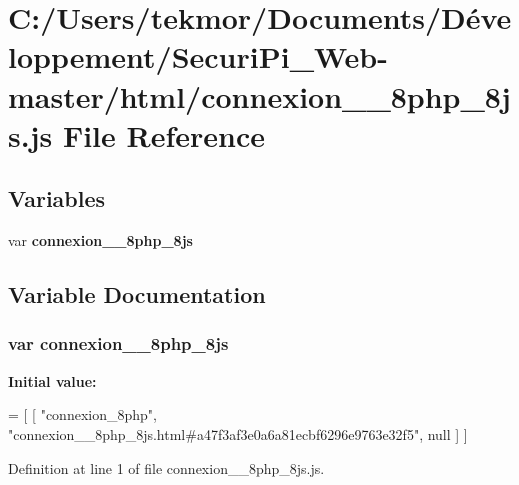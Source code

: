 \section{C\+:/\+Users/tekmor/\+Documents/\+Développement/\+Securi\+Pi\+\_\+\+Web-\/master/html/connexion\+\_\+\+\_\+8php\+\_\+8js.js File Reference}
\label{connexion____8php__8js_8js}
\subsection*{Variables}
\begin{DoxyCompactItemize}
\item 
var {\bf connexion\+\_\+\+\_\+8php\+\_\+8js}
\end{DoxyCompactItemize}


\subsection{Variable Documentation}
\subsubsection[{connexion\+\_\+\+\_\+8php\+\_\+8js}]{\setlength{\rightskip}{0pt plus 5cm}var connexion\+\_\+\+\_\+8php\+\_\+8js}\label{connexion____8php__8js_8js_ab192fa2d8f46bbb6a0862229e323476d}
{\bfseries Initial value\+:}
\begin{DoxyCode}
=
[
    [ \textcolor{stringliteral}{"connexion\_8php"}, \textcolor{stringliteral}{"connexion\_\_8php\_8js.html#a47f3af3e0a6a81ecbf6296e9763e32f5"}, null ]
]
\end{DoxyCode}


Definition at line 1 of file connexion\+\_\+\+\_\+8php\+\_\+8js.\+js.

